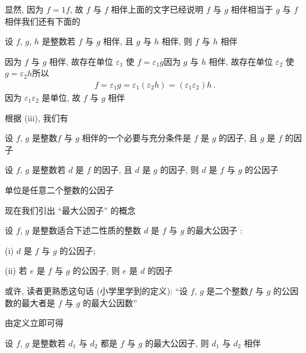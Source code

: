 显然, 因为 $f = 1f$, 故 $f$ 与 $f$ 相伴\period 上面的文字已经说明 $f$ 与 $g$ 相伴相当于 $g$ 与 $f$ 相伴\period 我们还有下面的
\begin{proposition}
    设 $f$, $g$, $h$ 是整数\period 若 $f$ 与 $g$ 相伴, 且 $g$ 与 $h$ 相伴, 则 $f$ 与 $h$ 相伴\period
\end{proposition}

\begin{pf}
    因为 $f$ 与 $g$ 相伴, 故存在单位 $\varepsilon_1$ 使 $f = \varepsilon_1 g$\period 因为 $g$ 与 $h$ 相伴, 故存在单位 $\varepsilon_2$ 使 $g = \varepsilon_2 h$\period 所以
    \begin{align*}
        f = \varepsilon_1 g = \varepsilon_1 (\varepsilon_2 h) = (\varepsilon_1 \varepsilon_2) h \period
    \end{align*}
    因为 $\varepsilon_1 \varepsilon_2$ 是单位, 故 $f$ 与 $g$ 相伴\period
\end{pf}

根据 (iii), 我们有
\begin{proposition}
    设 $f$, $g$ 是整数\period $f$ 与 $g$ 相伴的一个必要与充分条件是 $f$ 是 $g$ 的因子, 且 $g$ 是 $f$ 的因子\period
\end{proposition}

\begin{definition}
    设 $f$, $g$ 是整数\period 若 $d$ 是 $f$ 的因子, 且 $d$ 是 $g$ 的因子, 则 $d$ 是 $f$ 与 $g$ 的公因子 \period
\end{definition}

\begin{example}
    单位是任意二个整数的公因子\period
\end{example}

现在我们引出 ``最大公因子'' 的概念\period

\begin{definition}
    设 $f$, $g$ 是整数\period 适合下述二性质的整数 $d$ 是 $f$ 与 $g$ 的最大公因子 :

    (i) $d$ 是 $f$ 与 $g$ 的公因子;

    (ii) 若 $e$ 是 $f$ 与 $g$ 的公因子, 则 $e$ 是 $d$ 的因子\period
\end{definition}

\begin{remark}
    或许, 读者更熟悉这句话 (小学里学到的定义): ``设 $f$, $g$ 是二个整数\period $f$ 与 $g$ 的公因数的最大者是 $f$ 与 $g$ 的最大公因数\period''
\end{remark}

由定义立即可得
\begin{proposition}
    设 $f$, $g$ 是整数\period 若 $d_1$ 与 $d_2$ 都是 $f$ 与 $g$ 的最大公因子, 则 $d_1$ 与 $d_2$ 相伴\period
\end{proposition}

